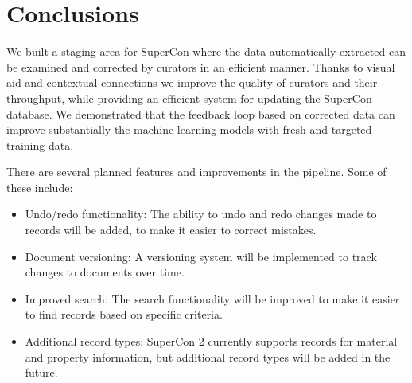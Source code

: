 \documentclass[a4paper]{article}
\begin{document}
\section{Conclusions}
We built a staging area for SuperCon where the data automatically extracted can be examined and corrected by curators in an efficient manner. Thanks to visual aid and contextual connections we improve the quality of curators and their throughput, while providing an efficient system for updating the SuperCon database. 
We demonstrated that the feedback loop based on corrected data can improve substantially the machine learning models with fresh and targeted training data. 

There are several planned features and improvements in the pipeline. Some of these include:

\begin{itemize}
    \item Undo/redo functionality: The ability to undo and redo changes made to records will be added, to make it easier to correct mistakes.
    \item Document versioning: A versioning system will be implemented to track changes to documents over time.
    \item Improved search: The search functionality will be improved to make it easier to find records based on specific criteria.
    \item Additional record types: SuperCon 2 currently supports records for material and property information, but additional record types will be added in the future.
\end{itemize}



\end{document}
